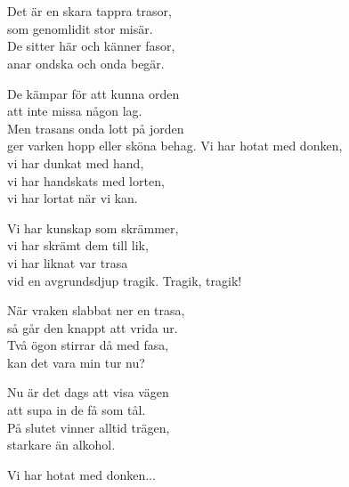 \\


 \\
\author{Text: Sara von Knorring }

\songtext{}Det är en skara tappra trasor,\\
som genomlidit stor misär.\\
De sitter här och känner fasor,\\
anar ondska och onda begär.

De kämpar för att kunna orden\\
att inte missa någon lag.\\
Men trasans onda lott på jorden\\
ger varken hopp eller sköna behag.
\newpage
Vi har hotat med donken,\\
vi har dunkat med hand,\\
vi har handskats med lorten,\\
vi har lortat när vi kan.

Vi har kunskap som skrämmer,\\
vi har skrämt dem till lik,\\
vi har liknat var trasa\\
vid en avgrundsdjup tragik. Tragik, tragik!

När vraken slabbat ner en trasa,\\
så går den knappt att vrida ur.\\
Två ögon stirrar då med fasa,\\
kan det vara min tur nu?

Nu är det dags att visa vägen\\
att supa in de få som tål.\\
På slutet vinner alltid trägen,\\
starkare än alkohol.

Vi har hotat med donken...

\\

\newpage 


 \\       
\author{Text: Sara von Knorring }

